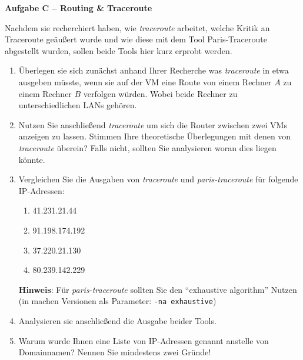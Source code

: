 \documentclass[paper=a4,fontsize=11pt]{scrartcl}%
\begin{document}
\begin{center}\Large{\textbf{Aufgabe C -- Routing \& Traceroute}}\end{center}\vskip0.25in
Nachdem sie recherchiert haben, wie \emph{traceroute} arbeitet, welche Kritik an Traceroute geäußert wurde und wie diese mit dem Tool Paris-Traceroute abgestellt wurden, sollen beide Tools hier kurz erprobt werden.
\begin{enumerate}
	\item Überlegen sie sich zunächst anhand Ihrer Recherche was \emph{traceroute} in etwa ausgeben müsste, wenn sie auf der VM eine Route von einem Rechner $A$ zu einem Rechner $B$ verfolgen würden. Wobei beide Rechner zu unterschiedlichen LANs gehören. 
	\item Nutzen Sie anschließend \emph{traceroute} um sich die Router zwischen zwei VMs anzeigen zu lassen. Stimmen Ihre theoretische Überlegungen mit denen von \emph{traceroute} überein? Falls nicht, sollten Sie analysieren woran dies liegen könnte.
	\item Vergleichen Sie die Ausgaben von \emph{traceroute} und \emph{paris-traceroute} für folgende IP-Adressen:
	\begin{enumerate}
		\item 41.231.21.44
		\item 91.198.174.192
		\item 37.220.21.130
		\item 80.239.142.229
	\end{enumerate}
	\textbf{Hinweis}: Für \emph{paris-traceroute} sollten Sie den \enquote{exhaustive algorithm} Nutzen (in machen Versionen als Parameter: \texttt{-na exhaustive})
	\item Analysieren sie anschließend die Ausgabe beider Tools.
	\item Warum wurde Ihnen eine Liste von IP-Adressen genannt anstelle von Domainnamen? Nennen Sie mindestens zwei Gründe!
\end{enumerate}
\end{document}
